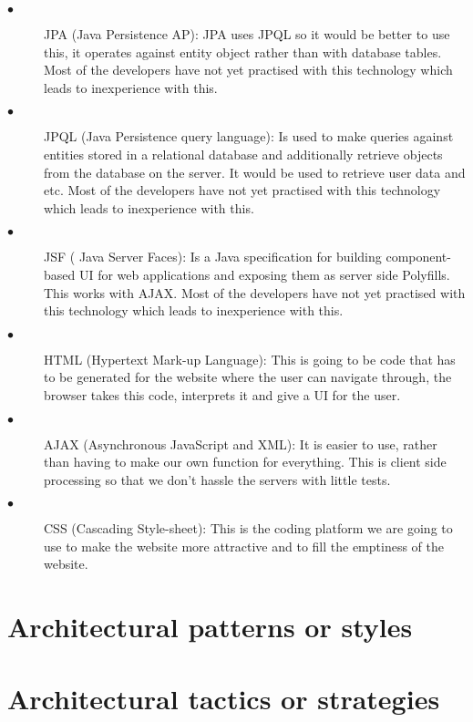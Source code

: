 \documentclass[12pt]{article}
\begin{document}
\begin{description}
\begin{description}
  \item[$\bullet$]JPA (Java Persistence AP):
  JPA uses JPQL so it would be better to use this, it operates against entity object rather than with database tables. Most of the developers have not yet practised with this technology which leads to inexperience with this. 
  
  \item[$\bullet$] JPQL (Java Persistence query language):
  Is used to make queries against entities stored in a relational database and additionally retrieve objects from the database on the server. It would be used to retrieve user data and etc. Most of the developers have not yet practised with this technology which leads to inexperience with this. 
  
  \item[$\bullet$] JSF ( Java Server Faces):
  Is a Java specification for building component-based UI for web applications and exposing them as server side Polyfills. This works with AJAX. Most of the developers have not yet practised with this technology which leads to inexperience with this. 
  
  \item[$\bullet$] HTML (Hypertext Mark-up Language):
  This is going to be code that has to be generated for the website where the user can navigate through, the browser takes this code, interprets it and give a UI for the user. 
  
  \item[$\bullet$] AJAX (Asynchronous JavaScript and XML):
  It is easier to use, rather than having to make our own function for everything. This is client side processing so that we don’t hassle the servers with little tests.
  
  \item[$\bullet$] CSS (Cascading Style-sheet):
  This is the coding platform we are going to use to make the website more attractive and to fill the emptiness of the website.
\end{description}

\section{Architectural patterns or styles}

\section{Architectural tactics or strategies}


\end{description}
\end{document}
